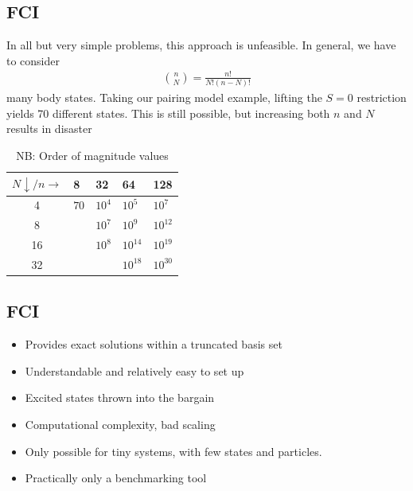 \documentclass[
11pt,notheorems,hyperref={pdfauthor=whatever}
]{beamer}
\begin{document}
\subsection{FCI}
\begin{frame}
    In all but very simple problems, this approach is unfeasible. In general, we have to consider 
    \begin{align*}
        \binom{n}{N} = \frac{n!}{N!(n-N)!}
    \end{align*}
    many body states. Taking our pairing model example, lifting the $S = 0$ restriction yields 70 different states. This is still possible, but increasing both $n$ and $N$ results in disaster
    
    \begin{table}
        \begin{tabular}{c|l|l|l|l}
        $N \downarrow /n \rightarrow$ & 8    & 32       & 64        & 128       \\
        \hline
        4     & $70$ & $10^{4}$ & $10^{5}$  & $10^{7}$  \\
        8     &      & $10^{7}$ & $10^{9}$  & $10^{12}$ \\
        16    &      & $10^{8}$ & $10^{14}$ & $10^{19}$ \\
        32    &      &          & $10^{18}$ & $10^{30}$
        \end{tabular}
        \caption{NB: Order of magnitude values}
    \end{table}
\end{frame}

\subsection{FCI}
\begin{frame}
    \textcolor{Green}{}
    \begin{itemize}
        \item Provides exact solutions within a truncated basis set
        \item Understandable and relatively easy to set up 
        \item Excited states thrown into the bargain
    \end{itemize}
    \vspace{20px}
    \textcolor{Red}{}
    \begin{itemize}
        \item Computational complexity, bad scaling
        \item Only possible for tiny systems, with few states and particles.
        \item Practically only a benchmarking tool
    \end{itemize}
\end{frame}
\end{document}
